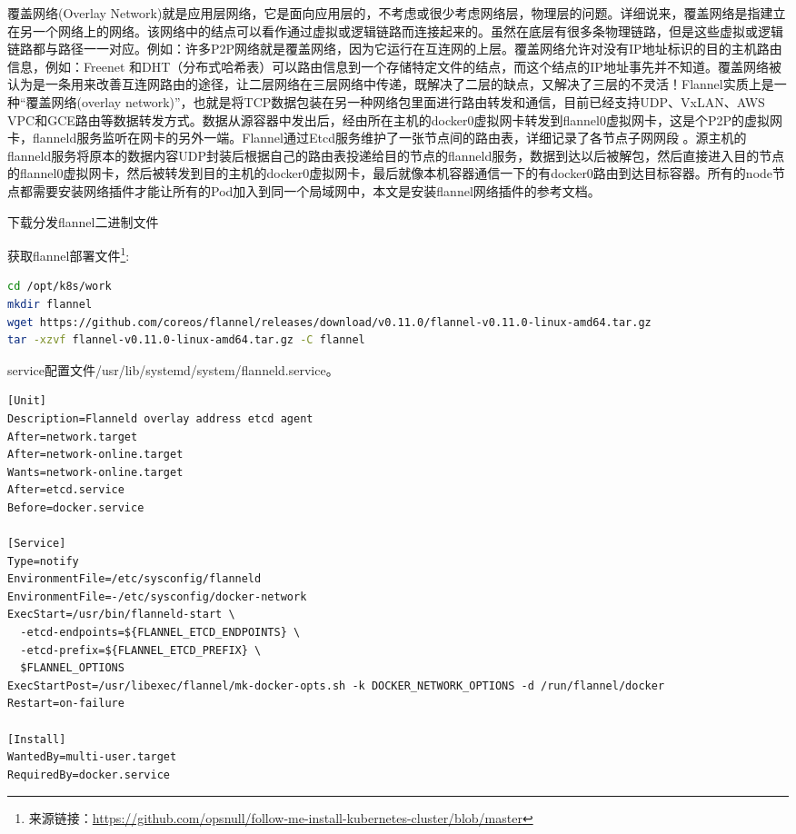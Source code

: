 \documentclass[8pt]{book}
\makeatletter
\numberwithin{dummy}{section}
\theoremstyle{ocrenumbox}
\theoremstyle{blacknumex}
\theoremstyle{blacknumbox}
\theoremstyle{ocrenum}
\renewcommand\paragraph{\@startsection{paragraph}{4}{\z@}
	{-2ex \@plus-.2ex \@minus .2ex}
	{.1ex}
	{\normalfont\small\sffamily\bfseries}}
\makeatother
\begin{document}
覆盖网络(Overlay Network)就是应用层网络，它是面向应用层的，不考虑或很少考虑网络层，物理层的问题。详细说来，覆盖网络是指建立在另一个网络上的网络。该网络中的结点可以看作通过虚拟或逻辑链路而连接起来的。虽然在底层有很多条物理链路，但是这些虚拟或逻辑链路都与路径一一对应。例如：许多P2P网络就是覆盖网络，因为它运行在互连网的上层。覆盖网络允许对没有IP地址标识的目的主机路由信息，例如：Freenet 和DHT（分布式哈希表）可以路由信息到一个存储特定文件的结点，而这个结点的IP地址事先并不知道。覆盖网络被认为是一条用来改善互连网路由的途径，让二层网络在三层网络中传递，既解决了二层的缺点，又解决了三层的不灵活！Flannel实质上是一种“覆盖网络(overlay network)”，也就是将TCP数据包装在另一种网络包里面进行路由转发和通信，目前已经支持UDP、VxLAN、AWS VPC和GCE路由等数据转发方式。数据从源容器中发出后，经由所在主机的docker0虚拟网卡转发到flannel0虚拟网卡，这是个P2P的虚拟网卡，flanneld服务监听在网卡的另外一端。Flannel通过Etcd服务维护了一张节点间的路由表，详细记录了各节点子网网段 。源主机的flanneld服务将原本的数据内容UDP封装后根据自己的路由表投递给目的节点的flanneld服务，数据到达以后被解包，然后直接进入目的节点的flannel0虚拟网卡，然后被转发到目的主机的docker0虚拟网卡，最后就像本机容器通信一下的有docker0路由到达目标容器。所有的node节点都需要安装网络插件才能让所有的Pod加入到同一个局域网中，本文是安装flannel网络插件的参考文档。

\paragraph{下载分发flannel二进制文件}

获取flannel部署文件\footnote{来源链接：\url{https://github.com/opsnull/follow-me-install-kubernetes-cluster/blob/master}}:

\begin{lstlisting}[language=Bash]
cd /opt/k8s/work
mkdir flannel
wget https://github.com/coreos/flannel/releases/download/v0.11.0/flannel-v0.11.0-linux-amd64.tar.gz
tar -xzvf flannel-v0.11.0-linux-amd64.tar.gz -C flannel
\end{lstlisting}

service配置文件/usr/lib/systemd/system/flanneld.service。

\begin{lstlisting}
[Unit]
Description=Flanneld overlay address etcd agent
After=network.target
After=network-online.target
Wants=network-online.target
After=etcd.service
Before=docker.service

[Service]
Type=notify
EnvironmentFile=/etc/sysconfig/flanneld
EnvironmentFile=-/etc/sysconfig/docker-network
ExecStart=/usr/bin/flanneld-start \
  -etcd-endpoints=${FLANNEL_ETCD_ENDPOINTS} \
  -etcd-prefix=${FLANNEL_ETCD_PREFIX} \
  $FLANNEL_OPTIONS
ExecStartPost=/usr/libexec/flannel/mk-docker-opts.sh -k DOCKER_NETWORK_OPTIONS -d /run/flannel/docker
Restart=on-failure

[Install]
WantedBy=multi-user.target
RequiredBy=docker.service
\end{lstlisting}
\end{document}

